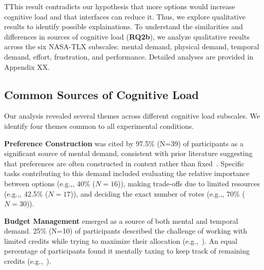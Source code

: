 TThis result contradicts our hypothesis that more options would increase cognitive load and that interfaces can reduce it. Thus, we explore qualitative results to identify possible explainations. To understand the similarities and differences in sources of cognitive load (\textbf{RQ2b}), we analyze qualitative results across the six NASA-TLX subscales: mental demand, physical demand, temporal demand, effort, frustration, and performance. Detailed analyses are provided in Appendix XX.

\subsection{Common Sources of Cognitive Load}
Our analysis revealed several themes across different cognitive load subscales. We identify four themes common to all experimental conditions.

\textbf{Preference Construction} was cited by 97.5\% (N=39) of participants as a significant source of mental demand, consistent with prior literature suggesting that preferences are often constructed in context rather than fixed~\cite{lichtensteinConstructionPreference2006}. Specific tasks contributing to this demand included evaluating the relative importance between options (e.g.,, 40\% ($N=16$)), making trade-offs due to limited resources (e.g.,, 42.5\% ($N=17$)), and deciding the exact number of votes (e.g.,, 70\% ($N=30$)).

\textbf{Budget Management} emerged as a source of both mental and temporal demand. 25\% (N=10) of participants described the challenge of working with limited credits while trying to maximize their allocation (e.g.,~). An equal percentage of participants found it mentally taxing to keep track of remaining credits (e.g.,~).


